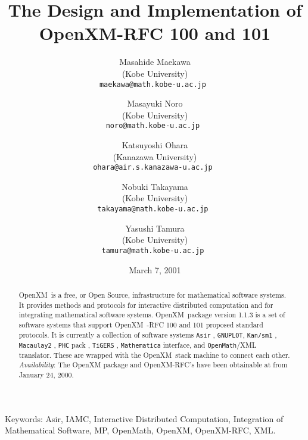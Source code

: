 \documentclass{article}
\def\Author#1{ #1 }
\def\Address#1{ (#1) }
\def\Email#1{ {\tt  #1 }}
\def\OpenXM{{\rm OpenXM\ }}
\begin{document}
\date{March 7, 2001}
\title{The Design and Implementation of OpenXM-RFC 100 and 101}
\author{\Author{Masahide Maekawa}\\
         \Address{Kobe University}\\
         \Email{maekawa@math.kobe-u.ac.jp}\\
         \and
         \Author{Masayuki Noro}\\
         \Address{Kobe University}\\
         \Email{noro@math.kobe-u.ac.jp}
         \and
         \Author{Katsuyoshi Ohara}\\
         \Address{Kanazawa University}\\
         \Email{ohara@air.s.kanazawa-u.ac.jp}
         \and
         \Author{Nobuki Takayama}\\
         \Address{Kobe University}\\
         \Email{takayama@math.kobe-u.ac.jp}
         \and
         \Author{Yasushi Tamura}\\
         \Address{Kobe University}\\
         \Email{tamura@math.kobe-u.ac.jp}
       }
\maketitle

\begin{abstract}
\OpenXM is a free, or Open Source, infrastructure for mathematical
software systems.
It provides methods and protocols 
for interactive distributed computation and
for integrating mathematical software systems.
\OpenXM package version 1.1.3 
is a set of software systems that support \OpenXM-RFC 100 and
101 proposed standard protocols.
It is currently a collection of software systems
{\tt Asir} \cite{asir}, 
{\tt GNUPLOT}, 
{\tt Kan/sm1} \cite{kan}, 
{\tt Macaulay2} \cite{Macaulay2},
{\tt PHC} pack \cite{phc}, 
{\tt TiGERS}  \cite{tigers},
{\tt Mathematica} interface, and
{\tt OpenMath}/XML \cite{OpenMath} translator.
These are wrapped with the \OpenXM stack machine
to connect each other.
{\it Availability}: The OpenXM package and OpenXM-RFC's 
have been obtainable at \cite{openxm-web}
from January 24, 2000.
\end{abstract}

\noindent
Keywords: 
Asir,
IAMC, Interactive Distributed Computation, 
Integration of Mathematical Software,
MP, OpenMath, OpenXM, OpenXM-RFC, XML. 
\end{document}
